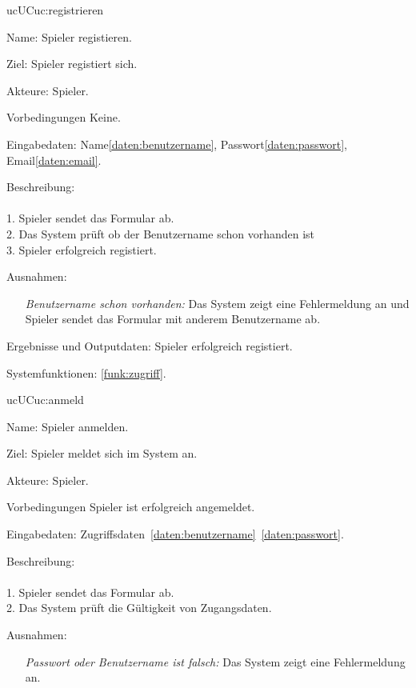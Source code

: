 \begin{description}[leftmargin=5em, style=sameline]
	\begin{lhp}{uc}{UC}{uc:registrieren}
	    \item [Name:] Spieler registieren.
	    \item [Ziel:] Spieler registiert sich.
	    \item [Akteure:] Spieler.
	    \item [Vorbedingungen] Keine.
        \item [Eingabedaten:] Name\ref{daten:benutzername}, Passwort\ref{daten:passwort}, Email\ref{daten:email}. 
	\item [Beschreibung:] \hfill\\ \hfill\\
	1. Spieler sendet das Formular ab.\\
	2. Das System prüft ob der Benutzername schon vorhanden ist\\	
	3. Spieler erfolgreich registiert.\\			
	\item [Ausnahmen:]\hfill 
	\begin{itemize} 
		\item[] \textit{Benutzername schon vorhanden:} Das System zeigt eine Fehlermeldung an und Spieler sendet das Formular mit anderem Benutzername ab.					
		
	\end{itemize}
	\item [Ergebnisse und Outputdaten:] Spieler erfolgreich registiert.	
	\item [Systemfunktionen:] \ref{funk:zugriff}.
    \end{lhp}
	
	\begin{lhp}{uc}{UC}{uc:anmeld}
		\item [Name:] Spieler anmelden.
		\item [Ziel:] Spieler meldet sich im System an.
		\item [Akteure:] Spieler.
		\item [Vorbedingungen] Spieler ist erfolgreich angemeldet.
		\item [Eingabedaten:] Zugriffsdaten~\ref{daten:benutzername}~\ref{daten:passwort}.
		\item [Beschreibung:] \hfill\\ \hfill\\
			1. Spieler sendet das Formular ab.\\
			2. Das System prüft die Gültigkeit von Zugangsdaten.\\				
		\item [Ausnahmen:]\hfill 
	    	\begin{itemize} 
			    \item[] \textit{Passwort oder Benutzername ist falsch:} Das System zeigt eine Fehlermeldung an.					
			

\end{itemize}
\end{lhp}
\end{description}
